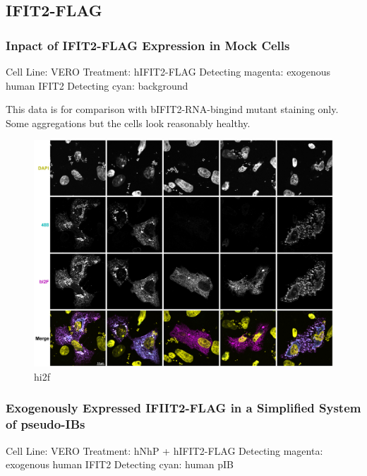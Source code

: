 \subsection{IFIT2-FLAG}
\subsubsection{Inpact of IFIT2-FLAG Expression in Mock Cells} \label{Inpact of IFIT2-FLAG Expression in Mock Cells}
Cell Line: VERO \newline
Treatment: hIFIT2-FLAG \newline
Detecting magenta: exogenous human IFIT2 \newline
Detecting cyan: background \newline

This data is for comparison with bIFIT2-RNA-bingind mutant staining only. Some aggregations but the cells look reasonably healthy.

\begin{figure}
    \centering
    \includegraphics[width=1\linewidth]{09. Chapter 4//Figs//03. IFIT2-FLAG/01. hi2f mock.png}
    \caption[hi2f]{hi2f}
    \label{hi2f}
\end{figure}


\subsubsection{Exogenously Expressed IFIIT2-FLAG in a Simplified System of pseudo-IBs} \label{Exogenously Expressed IFIIT2-FLAG in a Simplified System of pseudo-IBs}
Cell Line: VERO \newline
Treatment: hNhP + hIFIT2-FLAG \newline
Detecting magenta: exogenous human IFIT2 \newline
Detecting cyan: human pIB \newline

